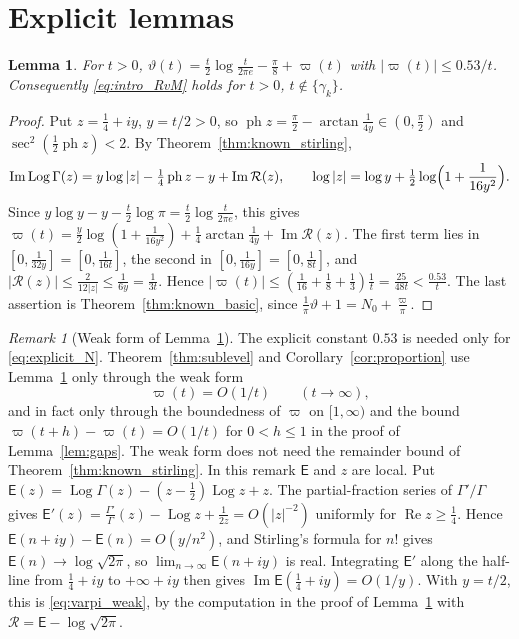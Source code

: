 \documentclass[11pt,a4paper]{article}
\makeatletter
\numberwithin{equation}{section}
\DeclareRobustCommand{\CGref}[1]{\ref{#1}}
\DeclareRobustCommand{\CGeqref}[1]{\eqref{#1}}
\let\CG@origref\ref
\let\CG@origeqref\eqref
\newcommand{\CG@gettip}[1]{\@ifundefined{CGTip@#1}{#1}{\csname CGTip@#1\endcsname}}
\DeclareRobustCommand{\CGref}[1]{\pdftooltip{\CG@origref{#1}}{\CG@gettip{#1}}}
\DeclareRobustCommand{\CGeqref}[1]{\pdftooltip{\CG@origeqref{#1}}{\CG@gettip{#1}}}
\newtheorem{lemma}[theorem]{Lemma}
\theoremstyle{definition}
\theoremstyle{remark}
\newtheorem{remark}[theorem]{Remark}
\newcommand{\Nz}{N_0} %
\makeatother
\begin{document}
\section{Explicit lemmas}\label{sec:explicit_lemmas}

\begin{lemma}\label{lem:varpi}
For $t>0$, $\vartheta(t)=\frac t2\log\frac t{2\pi e}-\frac\pi8+\varpi(t)$ with $|\varpi(t)|\le0.53/t$. Consequently \CGeqref{eq:intro_RvM} holds for $t>0$, $t\notin\{\gamma_k\}$.
\end{lemma}

\begin{proof}
Put $z=\frac14+iy$, $y=t/2>0$, so $\operatorname{ph}z=\frac\pi2-\arctan\frac1{4y}\in(0,\frac\pi2)$ and $\sec^2(\frac12\operatorname{ph}z)<2$. By Theorem~\CGref{thm:known_stirling},
\begin{equation}
\operatorname{Im}\operatorname{Log}\Gamma(z)=y\log|z|-\tfrac14\operatorname{ph}z-y+\operatorname{Im}\mathcal R(z),\qquad \log|z|=\log y+\tfrac12\log\Bigl(1+\frac1{16y^2}\Bigr).
\label{eq:disp_10}
\end{equation}
Since $y\log y-y-\frac t2\log\pi=\frac t2\log\frac t{2\pi e}$, this gives $\varpi(t)=\frac y2\log(1+\frac1{16y^2})+\frac14\arctan\frac1{4y}+\operatorname{Im}\mathcal R(z)$. The first term lies in $[0,\frac1{32y}]=[0,\frac1{16t}]$, the second in $[0,\frac1{16y}]=[0,\frac1{8t}]$, and $|\mathcal R(z)|\le\frac2{12|z|}\le\frac1{6y}=\frac1{3t}$. Hence $|\varpi(t)|\le(\frac1{16}+\frac18+\frac13)\frac1t=\frac{25}{48t}<\frac{0.53}t$. The last assertion is Theorem~\CGref{thm:known_basic}, since $\frac1\pi\vartheta+1=\Nz+\frac\varpi\pi$.
\end{proof}

\begin{remark}[Weak form of Lemma~\ref{lem:varpi}]\label{rem:varpi_weak}
The explicit constant $0.53$ is needed only for \CGeqref{eq:explicit_N}. Theorem~\CGref{thm:sublevel} and Corollary~\CGref{cor:proportion} use Lemma~\CGref{lem:varpi} only through the weak form
\begin{equation}
\varpi(t)=O(1/t)\qquad(t\to\infty),
\label{eq:varpi_weak}
\end{equation}
and in fact only through the boundedness of $\varpi$ on $[1,\infty)$ and the bound $\varpi(t+h)-\varpi(t)=O(1/t)$ for $0<h\le1$ in the proof of Lemma~\CGref{lem:gaps}. The weak form does not need the remainder bound of Theorem~\CGref{thm:known_stirling}. In this remark $\mathsf E$ and $z$ are local. Put $\mathsf E(z)=\operatorname{Log}\Gamma(z)-(z-\frac12)\operatorname{Log}z+z$. The partial-fraction series of $\Gamma'/\Gamma$ gives $\mathsf E'(z)=\frac{\Gamma'}\Gamma(z)-\operatorname{Log}z+\frac1{2z}=O(|z|^{-2})$ uniformly for $\operatorname{Re}z\ge\frac14$. Hence $\mathsf E(n+iy)-\mathsf E(n)=O(y/n^2)$, and Stirling's formula for $n!$ gives $\mathsf E(n)\to\log\sqrt{2\pi}$, so $\lim_{n\to\infty}\mathsf E(n+iy)$ is real. Integrating $\mathsf E'$ along the half-line from $\frac14+iy$ to $+\infty+iy$ then gives $\operatorname{Im}\mathsf E(\frac14+iy)=O(1/y)$. With $y=t/2$, this is \CGeqref{eq:varpi_weak}, by the computation in the proof of Lemma~\CGref{lem:varpi} with $\mathcal R=\mathsf E-\log\sqrt{2\pi}$.
\end{remark}
\end{document}
